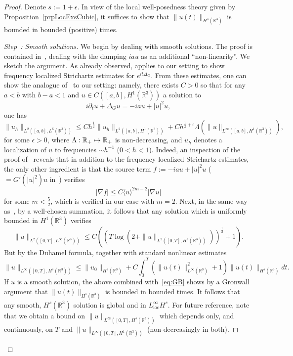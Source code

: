 \documentclass[10pt]{amsart}
\theoremstyle{definition}\newtheorem{defi}[theo]{Definition}\newtheorem{rema}[theo]{Remark}\newtheorem{exam}[theo]{Example}\newtheorem{exem}[theo]{Example}\newtheorem{nota}[theo]{Notation}
\newcommand*\R{\mathbb{R}}
\DeclareMathOperator{\locc}{loc}
\newcounter{setofstep}
\newcounter{step}[setofstep]
\newenvironment{step}[1][]{\refstepcounter{step}\begin{proof}[{Step~\thestep\if#1\empty\else: #1\fi}]}{\let\qed\relax\end{proof}}
\let\oldmapsto\mapsto
\renewcommand*{\mapsto}{\mathchoice{\longmapsto}{\oldmapsto}{\oldmapsto}{\oldmapsto}}
\begin{document}
\begin{proof}
Denote $s := 1 + \epsilon$. In view of the local well-posedness theory given by Proposition~\ref{prpLocExsCubic}, it suffices to show that $\| u(t) \|_{H^s(\R^3)}$ is bounded in bounded (positive) times.

\begin{step}[{Smooth solutions}]
We begin by dealing with smooth solutions. The proof is contained in~\cite[Section 3.3]{BuGeTz04}, dealing with the damping $iau$ as an additional ``non-linearity''. We sketch the argument. As already observed, \cite{BuGeTz04} applies to our setting to show frequency localized Strichartz estimates for $e^{it\Delta_G}$. From these estimates, one can show the analogue of~\cite[Lemma~3.6]{BuGeTz04} to our setting: namely, there exists $C>0$ so that for any $a<b$ with $b-a < 1$ and $u \in C([a, b], H^1(\R^3))$ a solution to
\[
i \partial_t u + \Delta_G u = - i au + |u|^2 u,
\]
one has
\begin{equation}\label{eq:3.11}
\| u_h \|_{L^2\left([a,b], L^6(\R^3)\right)} \leq C h^{\frac 12}
\| u_h\|_{L^2\left([a,b],H^1(\R^3)\right)} + Ch^{\frac 12 + \epsilon} \Lambda\left(\| u \|_{L^\infty\left([a,b], H^1(\R^3)\right)}\right),
\end{equation}
for some $\epsilon > 0$, where $\Lambda : \R_+ \mapsto \R_+$ is non-decreasing, and $u_h$ denotes a localization of $u$ to frequencies $\sim h^{-1}$ ($0<h<1$). Indeed, an inspection of the proof of~\cite[Lemma~3.6]{BuGeTz04} reveals that in addition to the frequency localized Strichartz estimates, the only other ingredient is that the source term $f:= - i au + |u|^2 u$ ($= G'(|u|^2)u$ in~\cite{BuGeTz04}) verifies
\[
|\nabla f| \leq C \langle u \rangle^{2m - 2} |\nabla u|
\]
for some $m< \frac 5 2$, which is verified in our case with $m = 2$. Next, in the same way as~\cite[p.~589-590]{BuGeTz04}, by a well-chosen summation, it follows that any solution which is uniformly bounded in $H^1(\R^3)$ verifies
\begin{equation}\label{eq:GB}
\| u \|_{L^2([0,T], L^\infty(\R^3))} \leq C \left(\left(T \log\left(2 + \| u \|_{L^2\left([0,T], H^s(\R^3)\right)}\right)\right)^{\frac 12} + 1\right).
\end{equation}
But by the Duhamel formula, together with standard nonlinear estimates
\[
\| u \|_{L^\infty\left([0, T], H^s(\R^3)\right)} \leq \| u_0 \|_{H^s(\R^3)} + C \int_0^T \left(\| u(t) \|_{L^\infty(\R^3)}^2 + 1\right)\| u(t) \|_{H^s(\R^3)} dt.
\]
If $u$ is a smooth solution, the above combined with~\eqref{eq:GB} shows by a Gronwall argument that $\| u(t) \|_{H^s(\R^3)}$ is bounded in bounded times. It follows that any smooth, $H^s(\R^3)$ solution is global and in $L^\infty_{\locc}H^s$. For future reference, note that we obtain a bound on $\| u \|_{L^\infty([0, T], H^s(\R^3))}$ which depends only, and continuously, on $T$ and $\| u \|_{L^\infty([0, T], H^1(\R^3))}$ (non-decreasingly in both).
\end{step}


\end{proof}
\end{document}
